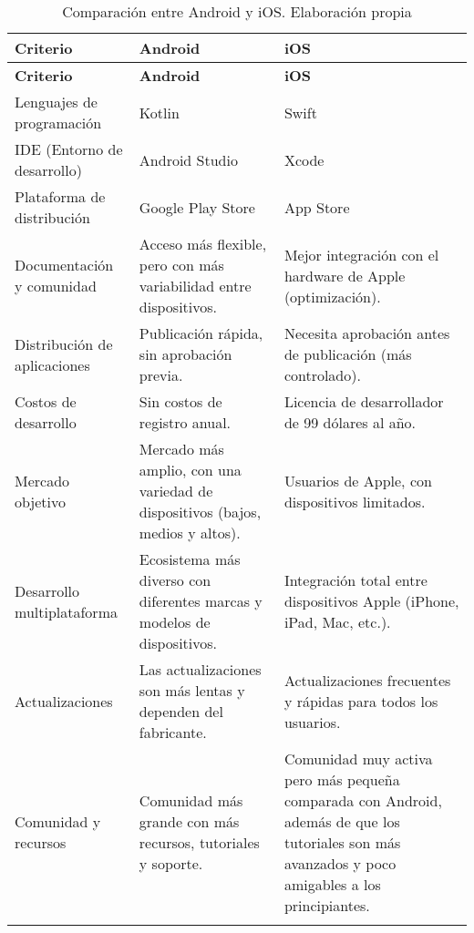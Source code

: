 \begin{longtable}{|p{5cm}|p{5cm}|p{5cm}|}
    \hline
    \textbf{Criterio} & \textbf{Android} & \textbf{iOS} \\ 
    \endfirsthead
    \hline
    \textbf{Criterio} & \textbf{Android} & \textbf{iOS} \\  
    \hline
    \endhead
    \hline
    \endfoot
    \endlastfoot
    \hline
    Lenguajes de programación & Kotlin & Swift \\ \hline
    IDE (Entorno de desarrollo) & Android Studio & Xcode \\ \hline
    Plataforma de distribución & Google Play Store & App Store \\ \hline
    Documentación y comunidad & Acceso más flexible, pero con más variabilidad entre dispositivos. & Mejor integración con el hardware de Apple (optimización). \\ \hline
    Distribución de aplicaciones & Publicación rápida, sin aprobación previa. & Necesita aprobación antes de publicación (más controlado). \\ \hline
    Costos de desarrollo & Sin costos de registro anual. & Licencia de desarrollador de 99 dólares al año. \\ \hline
    Mercado objetivo & Mercado más amplio, con una variedad de dispositivos (bajos, medios y altos). & Usuarios de Apple, con dispositivos limitados. \\ \hline
    Desarrollo multiplataforma & Ecosistema más diverso con diferentes marcas y modelos de dispositivos. & Integración total entre dispositivos Apple (iPhone, iPad, Mac, etc.). \\ \hline
    Actualizaciones & Las actualizaciones son más lentas y dependen del fabricante. & Actualizaciones frecuentes y rápidas para todos los usuarios. \\ \hline
    Comunidad y recursos & Comunidad más grande con más recursos, tutoriales y soporte. & Comunidad muy activa pero más pequeña comparada con Android, además de que los tutoriales son más avanzados y poco amigables a los principiantes. \\
    \hline
    
    \caption{Comparación entre Android y iOS. Elaboración propia}
    \label{tab:Tabla1}
\end{longtable}


